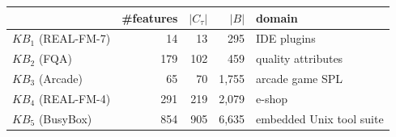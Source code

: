 \begin{tabular}{lrrrl}
\toprule
 & \#features & $|C_\tau|$ & $|B|$ & domain \\
\midrule
$KB_1$ (REAL-FM-7) & 14 & 13 & 295 & IDE plugins \\
$KB_2$ (FQA) & 179 & 102 & 459 & quality attributes \\
$KB_3$ (Arcade) & 65 & 70 & 1{,}755 & arcade game SPL \\
$KB_4$ (REAL-FM-4) & 291 & 219 & 2{,}079 & e-shop \\
$KB_5$ (BusyBox) & 854 & 905 & 6{,}635 & embedded Unix tool suite \\
\bottomrule
\end{tabular}

